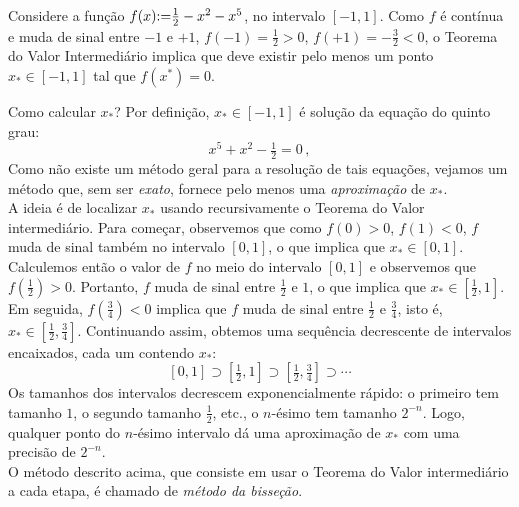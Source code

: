 \begin{ex}
Considere a função 
$f(x){:=} \tfrac12-x^2-x^5$,
no intervalo $[-1,1]$. Como $f$ é contínua e muda de
sinal entre $-1$ e $+1$,
$f(-1)=\frac12>0$, 
$f(+1)=-\frac32<0$, 
o Teorema do Valor Intermediário implica que 
deve existir pelo menos um ponto $x_*\in [-1,1]$ tal que $f(x^*)=0$.
\begin{center}
\begin{bmlimage}\end{bmlimage}
\end{center}

Como calcular $x_*$? Por definição, $x_*\in [-1,1]$ é solução da
equação do quinto grau:
$$x^5+x^2-\tfrac12=0\,,$$
Como não existe um método geral para a resolução de tais equações, vejamos um
método que, sem ser \emph{exato}, fornece pelo menos uma \emph{aproximação}
de $x_*$.\\

A ideia é de localizar $x_*$ usando recursivamente o Teorema do Valor intermediário. 
Para começar, observemos que como $f(0)>0$, $f(1)<0$, 
$f$ muda de sinal também no intervalo $[0,1]$, o que implica que 
$x_*\in [0,1]$.\\

Calculemos então o valor de $f$ no meio do
intervalo $[0,1]$ e observemos que $f(\frac12)>0$. Portanto, $f$ muda
de sinal entre $\frac12$ e $1$, o que implica que $x_*\in
[\frac12,1]$. 
Em seguida, $f(\frac34)<0$ implica que $f$ muda de sinal entre
$\frac12$ e $\frac34$, isto é, $x_*\in [\frac12,\frac34]$. Continuando
assim, obtemos uma sequência decrescente de intervalos encaixados,
cada um contendo $x_*$:
$$[0,1]\supset [\tfrac12,1]\supset [\tfrac12,\tfrac34]\supset \cdots
$$
Os tamanhos dos intervalos decrescem exponencialmente rápido: o
primeiro tem tamanho $1$, o segundo tamanho $\frac12$, etc., o 
$n$-ésimo tem tamanho $2^{-n}$.
Logo, qualquer ponto do $n$-ésimo intervalo dá uma aproximação 
de $x_*$ com uma precisão de $2^{-n}$.\\

O método descrito acima, que consiste em usar o Teorema do Valor
intermediário a cada etapa, é chamado de \emph{método da bisseção}.

\end{ex}




